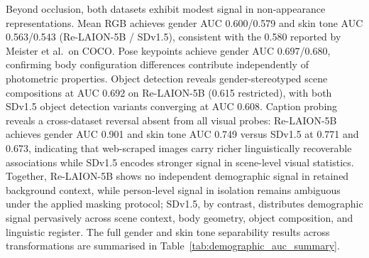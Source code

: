 Beyond occlusion, both datasets exhibit modest signal in non-appearance representations.
Mean RGB achieves gender AUC 0.600/0.579 and skin tone AUC 0.563/0.543 (Re-LAION-5B /
SDv1.5), consistent with the 0.580 reported by Meister et al.\ on COCO. Pose keypoints
achieve gender AUC 0.697/0.680, confirming body configuration differences contribute
independently of photometric properties. Object detection reveals gender-stereotyped scene
compositions at AUC 0.692 on Re-LAION-5B (0.615 restricted), with both SDv1.5
object detection variants converging at AUC 0.608. Caption probing reveals a cross-dataset reversal
absent from all visual probes: Re-LAION-5B achieves gender AUC 0.901 and skin tone AUC
0.749 versus SDv1.5 at 0.771 and 0.673, indicating that web-scraped images carry richer
linguistically recoverable associations while SDv1.5 encodes stronger signal in
scene-level visual statistics. Together, Re-LAION-5B shows no independent demographic signal in retained background context,
while person-level signal in isolation remains ambiguous under the applied masking protocol; SDv1.5,
by contrast, distributes demographic signal pervasively across scene context, body geometry, object composition, and linguistic register. The full gender and skin tone separability results across transformations are summarised in Table~\ref{tab:demographic_auc_summary}.

